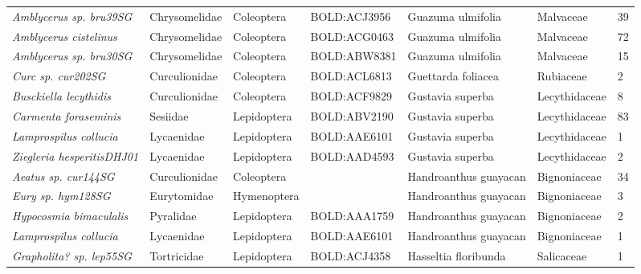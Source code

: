 \documentclass[11pt]{article}
\begin{document}
\begin{landscape}
\begin{longtable}{@{}lllllll@{}}
\textit{Amblycerus sp. bru39SG}                       & Chrysomelidae   & Coleoptera   & BOLD:ACJ3956 & Guazuma ulmifolia                  & Malvaceae        & 39    \\
\textit{Amblycerus cistelinus}                        & Chrysomelidae   & Coleoptera   & BOLD:ACG0463 & Guazuma ulmifolia                  & Malvaceae        & 72    \\
\textit{Amblycerus sp. bru30SG}                       & Chrysomelidae   & Coleoptera   & BOLD:ABW8381 & Guazuma ulmifolia                  & Malvaceae        & 15    \\
\textit{Curc sp. cur202SG}                            & Curculionidae   & Coleoptera   & BOLD:ACL6813 & Guettarda foliacea                 & Rubiaceae        & 2     \\
\textit{Busckiella lecythidis}                        & Curculionidae   & Coleoptera   & BOLD:ACF9829 & Gustavia superba                   & Lecythidaceae    & 8     \\
\textit{Carmenta foraseminis}                         & Sesiidae        & Lepidoptera  & BOLD:ABV2190 & Gustavia superba                   & Lecythidaceae    & 83    \\
\textit{Lamprospilus collucia}                        & Lycaenidae      & Lepidoptera  & BOLD:AAE6101 & Gustavia superba                   & Lecythidaceae    & 1     \\
\textit{Ziegleria hesperitisDHJ01}                    & Lycaenidae      & Lepidoptera  & BOLD:AAD4593 & Gustavia superba                   & Lecythidaceae    & 2     \\
\textit{Aeatus sp. cur144SG}                          & Curculionidae   & Coleoptera   &              & Handroanthus guayacan              & Bignoniaceae     & 34    \\
\textit{Eury sp. hym128SG}                            & Eurytomidae     & Hymenoptera  &              & Handroanthus guayacan              & Bignoniaceae     & 3     \\
\textit{Hypocosmia bimaculalis}                       & Pyralidae       & Lepidoptera  & BOLD:AAA1759 & Handroanthus guayacan              & Bignoniaceae     & 2     \\
\textit{Lamprospilus collucia}                        & Lycaenidae      & Lepidoptera  & BOLD:AAE6101 & Handroanthus guayacan              & Bignoniaceae     & 1     \\
\textit{Grapholita? sp. lep55SG}                      & Tortricidae     & Lepidoptera  & BOLD:ACJ4358 & Hasseltia floribunda               & Salicaceae       & 1     \\

\end{longtable}
\end{landscape}
\end{document}
